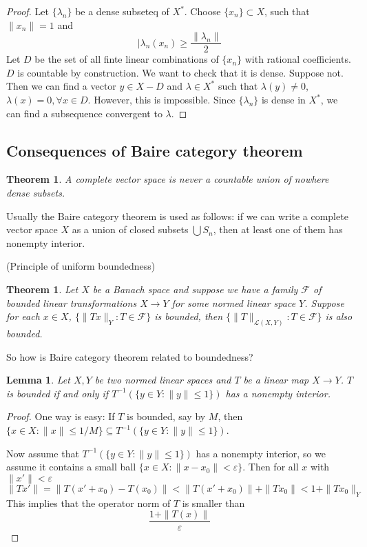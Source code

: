 \documentclass[12pt]{article}
\theoremstyle{plain}
\newtheorem{theorem}[equation]{Theorem}
\newtheorem{lemma}[equation]{Lemma}
\theoremstyle{definition}
\theoremstyle{named}
\newcommand{\shF}{\mathscr{F}}
\newcommand{\shL}{\mathscr{L}}
\newcommand\union{\bigcup}
\newcommand{\<}{\langle}
\renewcommand{\>}{\rangle}
\newcommand{\sm}{\varepsilon}
\begin{document}
\begin{proof}
Let $\{ \lambda_n \}$ be a dense subseteq of $X^*$. Choose $\{ x_n \} \subset X$, such that 
$ \| x_n \| = 1$ and 
$$ | \lambda_n (x_n) \ge \frac{\| \lambda_n \|}{2} $$
Let $D$ be the set of all finte linear combinations of $\{ x_n \}$ with rational coefficients. $D$ is countable by construction. We want to check that it is dense. Suppose not. Then we can find a vector $y \in X - D$ and $\lambda \in X^*$ such that $\lambda(y) \neq 0$, $\lambda(x) = 0, \forall x \in D$. However, this is impossible. Since $\{ \lambda_n \}$ is dense in $X^*$, we can find a subsequence convergent to $\lambda$. 
\end{proof}

\subsection{Consequences of Baire category theorem}

\begin{theorem}
A complete vector space is never a countable union of nowhere dense subsets. 
\end{theorem}
Usually the Baire category theorem is used as follows: if we can write a complete vector space $X$ as a union of closed subsets $\union S_n$, then at least one of them has nonempty interior. 

(Principle of uniform boundedness)
\begin{theorem}
Let $X$ be a Banach space and suppose we have a family $\shF$ of bounded linear transformations $X \to Y$ for some normed linear space $Y$. Suppose for each $x \in X$, $\{ \| T x \|_Y : T \in \shF \}$ is bounded, then $\{ \| T \|_{\shL(X, Y)} : T \in \shF \}$ is also bounded. 
\end{theorem}
So how is Baire category theorem related to boundedness?
\begin{lemma}
Let $X, Y$ be two normed linear spaces and $T$ be a linear map $X \to Y$. $T$ is bounded if and only if $T^{-1}(\{ y \in Y : \|y \| \le 1 \})$ has a nonempty interior. 
\end{lemma}
\begin{proof}
One way is easy: If $T$ is bounded, say by $M$, then $\{ x \in X : \| x \| \le 1/M \} \subseteq T^{-1}(\{ y \in Y : \|y \| \le 1 \})$. 

Now assume that $T^{-1}(\{ y \in Y : \|y \| \le 1 \})$ has a nonempty interior, so we assume it contains a small ball $\{ x \in X: \| x - x_0 \| < \sm \}$. Then for all $x$ with $\| x'  \| < \sm$
$$ \| Tx' \| = \| T(x' + x_0) - T(x_0) \| < \| T(x' + x_0) \| + \| T x_0 \| < 1 + \| T x_0 \|_Y $$ 
This implies that the operator norm of $T$ is smaller than 
$$ \frac{1 + \| T (x) \|}{\sm} $$
\end{proof}
\end{document}
